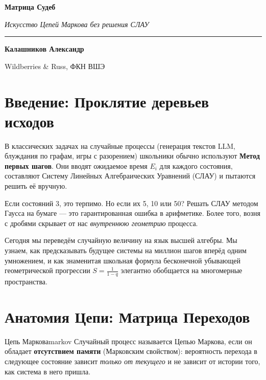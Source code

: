 \documentclass[12pt,a4paper]{article}
\begin{document}
\begin{center}
    \vspace*{1.0cm}
    {\Huge \bfseries Матрица Судеб\par}
    \vspace{0.4cm}
    {\Large \itshape Искусство Цепей Маркова без решения СЛАУ\par}
    \vspace{0.6cm}
    \rule{0.6\textwidth}{1pt}\par
    \vspace{0.6cm}
    {\large \textbf{Калашников Александр}}\par
    \vspace{0.2cm}
    {\small Wildberries \& Russ, ФКН ВШЭ}
    \vspace{1.0cm}
\end{center}

\tableofcontents
\newpage

\section{Введение: Проклятие деревьев исходов}

В классических задачах на случайные процессы (генерация текстов LLM, блуждания по графам, игры с разорением) школьники обычно используют \textbf{Метод первых шагов}. Они вводят ожидаемое время $E_i$ для каждого состояния, составляют Систему Линейных Алгебраических Уравнений (СЛАУ) и пытаются решить её вручную.

Если состояний 3, это терпимо. Но если их 5, 10 или 50? Решать СЛАУ методом Гаусса на бумаге — это гарантированная ошибка в арифметике. Более того, возня с дробями скрывает от нас \textit{внутреннюю геометрию} процесса. 

Сегодня мы переведём случайную величину на язык высшей алгебры. Мы узнаем, как предсказывать будущее системы на миллион шагов вперёд одним умножением, и как знаменитая школьная формула бесконечной убывающей геометрической прогрессии $S = \frac{1}{1-q}$ элегантно обобщается на многомерные пространства.

\section{Анатомия Цепи: Матрица Переходов}

\begin{definition}{Цепь Маркова}{markov}
Случайный процесс называется Цепью Маркова, если он обладает \textbf{отсутствием памяти} (Марковским свойством): вероятность перехода в следующее состояние зависит \textit{только от текущего} и не зависит от истории того, как система в него пришла.
\end{definition}
\end{document}
